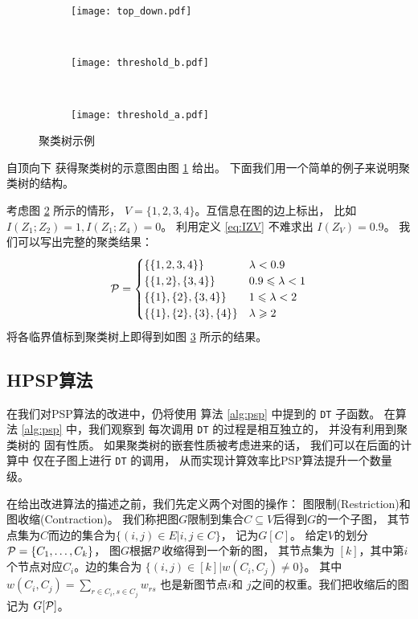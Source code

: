   \begin{figure}[!ht]
    \centering
    \begin{subfigure}[b]{0.38\linewidth}
      \centering
      \texttt{[image: top\_down.pdf]}
      \caption{}\label{fig:top_down}
    \end{subfigure}~
  \begin{subfigure}[b]{0.29\linewidth}
    \centering
    \texttt{[image: threshold\_b.pdf]}
    \caption{}\label{fig:threshold_b}
  \end{subfigure}~
  \begin{subfigure}[b]{0.33\linewidth}
    \centering
    \texttt{[image: threshold\_a.pdf]}
    \caption{}\label{fig:threshold_a}
  \end{subfigure}
  \caption{聚类树示例}\label{fig:mmi_example}
  \end{figure}
自顶向下
获得聚类树的示意图由图 \ref{fig:top_down} 给出。
下面我们用一个简单的例子来说明聚类树的结构。
  \begin{example}\label{ex:mmi_tree}
考虑图 \ref{fig:threshold_b} 所示的情形，
$V=\{1,2,3,4\}$。互信息在图的边上标出，
比如 $I(Z_1;Z_2)=1, I(Z_1;Z_4)=0$。
利用定义 \ref{eq:IZV} 不难求出
$I(Z_V)=0.9$。 
我们可以写出完整的聚类结果：
\begin{equation*}
\P = 
\begin{cases}
\{\{1,2,3,4\}\} & \lambda < 0.9 \\
\{\{1,2\},\{3,4\}\} & 0.9 \leq \lambda < 1 \\
\{\{1\},\{2\},\{3,4\}\} & 1 \leq \lambda < 2\\
\{\{1\},\{2\},\{3\},\{4\}\} & \lambda \geq 2
\end{cases}
\end{equation*}
将各临界值标到聚类树上即得到如图
 \ref{fig:threshold_a} 所示的结果。
\end{example}
\subsection{HPSP算法}
在我们对PSP算法的改进中，仍将使用
算法 \ref{alg:psp} 中提到的
\texttt{DT} 子函数。
在算法 \ref{alg:psp} 中，我们观察到
每次调用 \texttt{DT} 的过程是相互独立的，
并没有利用到聚类树的 固有性质。
如果聚类树的嵌套性质被考虑进来的话，
我们可以在后面的计算中
仅在子图上进行 \texttt{DT} 的调用，
从而实现计算效率比PSP算法提升一个数量级。

在给出改进算法的描述之前，我们先定义两个对图的操作：
图限制(Restriction)和图收缩(Contraction)。
我们称把图$G$限制到集合$C\subseteq V$后得到$G$的一个子图，
其节点集为$C$而边的集合为$\{(i,j) \in E | i,j \in C \}$，
记为$G[C]$。
给定$V$的划分 $\P=\{C_1, \dots, C_k\}$，
图$G$根据$\P$收缩得到一个新的图，
其节点集为
$[k]$，其中第$i$个节点对应$C_i$。边的集合为
$\{(i,j) \in [k] | w(C_i, C_j) \neq 0 \}$。
其中$w(C_i, C_j)=\sum_{r \in C_i, s \in C_j} w_{rs} $
也是新图节点$i$和 $j$之间的权重。我们把收缩后的图记为
$G[\P]$。


